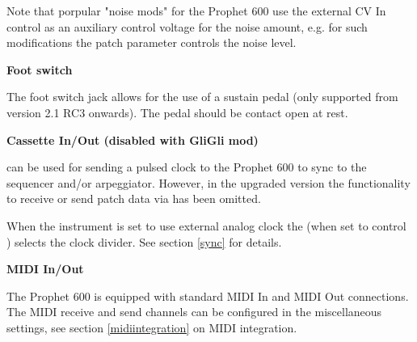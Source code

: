 Note that porpular "noise mods" for the Prophet 600 use the external CV In control as an auxiliary control voltage for the noise amount, e.g. for such modifications the patch parameter controls the noise level.

\textbf{Foot switch}

The foot switch jack allows for the use of a sustain pedal (only supported from version 2.1 RC3 onwards). The pedal should be contact open at rest.

\textbf{Cassette In/Out (disabled with GliGli mod)}

\cassettein can be used for sending a pulsed clock to the Prophet 600 to sync to the sequencer and/or arpeggiator. However, in the upgraded version the functionality to receive or send patch data via \cassettein has been omitted. 

When the instrument is set to use external analog clock the \datadial (when set to control \clock) selects the clock divider. See section \ref{sync} for details.

\textbf{MIDI In/Out}

The Prophet 600 is equipped with standard MIDI In and MIDI Out connections. The MIDI receive and send channels can be configured in the miscellaneous settings, see section \ref{midiintegration} on MIDI integration.  
